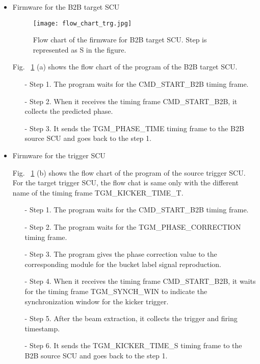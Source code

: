 \begin{itemize}
\begin{itemize}
	\end{itemize}
\item Firmware for the B2B target SCU
\begin{figure}[H]
   \centering   
   \texttt{[image: flow\_chart\_trg.jpg]}
   \caption{Flow chart of the firmware for B2B target SCU. Step is represented as S in the figure.}
   \label{flow_chart_trg}
\end{figure}
Fig. ~\ref{flow_chart_trg} (a) shows the flow chart of the program of the B2B target SCU.
 	\begin{itemize}
		\item[-]Step 1. The program waits for the CMD\_START\_B2B timing frame.
 		\item[-]Step 2. When it receives the timing frame CMD\_START\_B2B, it collects the predicted phase.
		\item[-]Step 3. It sends the TGM\_PHASE\_TIME timing frame to the B2B source SCU and goes back to the step 1.
	\end{itemize}
\item Firmware for the trigger SCU

Fig. ~\ref{flow_chart_trg} (b) shows the flow chart of the program of the source trigger SCU. For the target trigger SCU, the flow chat is same only with the different name of the timing frame TGM\_KICKER\_TIME\_T.
 	\begin{itemize}
		\item[-]Step 1. The program waits for the CMD\_START\_B2B timing frame.
		\item[-]Step 2. The program waits for the TGM\_PHASE\_CORRECTION timing frame.
		\item[-]Step 3. The program gives the phase correction value to the corresponding module for the bucket label signal reproduction.
 		\item[-]Step 4. When it receives the timing frame CMD\_START\_B2B, it waits for the timing frame TGM\_SYNCH\_WIN to indicate the synchronization window for the kicker trigger.
		\item[-]Step 5. After the beam extraction, it collects the trigger and firing timestamp. 
		\item[-]Step 6. It sends the TGM\_KICKER\_TIME\_S timing frame to the B2B source SCU and goes back to the step 1.
	\end{itemize}

\end{itemize}
